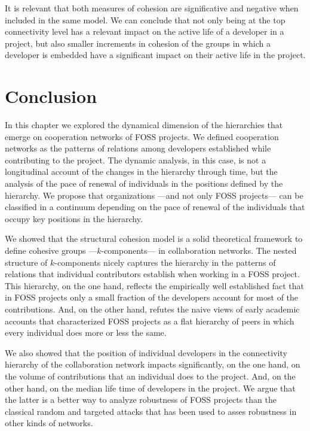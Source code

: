 It is relevant that both measures of cohesion are significative and negative when included in the same model. We can conclude that not only being at the top connectivity level has a relevant impact on the active life of a developer in a project, but also smaller increments in cohesion of the groups in which a developer is embedded have a significant impact on their active life in the project.

\section{Conclusion}

In this chapter we explored the dynamical dimension of the hierarchies that emerge on cooperation networks of FOSS projects. We defined cooperation networks as the patterns of relations among developers established while contributing to the project. The dynamic analysis, in this case, is not a longitudinal account of the changes in the hierarchy through time, but the analysis of the pace of renewal of individuals in the positions defined by the hierarchy. We propose that organizations ---and not only FOSS projects--- can be classified in a continuum depending on the pace of renewal of the individuals that occupy key positions in the hierarchy.

We showed that the structural cohesion model \citep{white:2001, moody:2003} is a solid theoretical framework to define cohesive groups ---$k$-components--- in collaboration networks. The nested structure of $k$-components nicely captures the hierarchy in the patterns of relations that individual contributors establish when working in a FOSS project. This hierarchy, on the one hand, reflects the empirically well established fact that in FOSS projects only a small fraction of the developers account for most of the contributions. And, on the other hand, refutes the naive views of early academic accounts that characterized FOSS projects as a flat hierarchy of peers in which every individual does more or less the same.

We also showed that the position of individual developers in the connectivity hierarchy of the collaboration network impacts significantly, on the one hand, on the volume of contributions that an individual does to the project. And, on the other hand, on the median life time of developers in the project. We argue that the latter is a better way to analyze robustness of FOSS projects than the classical random and targeted attacks that has been used to asses robustness in other kinds of networks.

